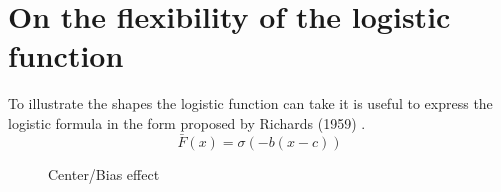 \section{On the flexibility of the logistic function}
To illustrate the shapes the logistic function can take it is useful to express the logistic formula in the form proposed by Richards (1959) \cite{richards-1959} .
\begin{equation}
\bar{F}(x) =\sigma( -b(x-c))  \nonumber
\end{equation}

\begin{figure}[H]
  \centering
 \caption{Center/Bias effect}
 \label{fig:center_shift}
\end{figure}

